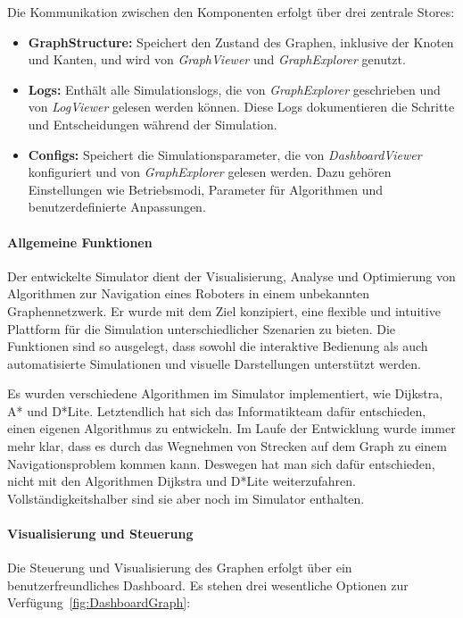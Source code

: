 \documentclass[main.tex]{subfiles} %
\begin{document}
Die Kommunikation zwischen den Komponenten erfolgt über drei zentrale Stores:
\begin{itemize}
  \item \textbf{GraphStructure:} Speichert den Zustand des Graphen,
    inklusive der Knoten und Kanten, und wird von
    \textit{GraphViewer} und \textit{GraphExplorer} genutzt.
  \item \textbf{Logs:} Enthält alle Simulationslogs, die von
    \textit{GraphExplorer} geschrieben und von \textit{LogViewer}
    gelesen werden können. Diese Logs dokumentieren die Schritte und
    Entscheidungen während der Simulation.
  \item \textbf{Configs:} Speichert die Simulationsparameter, die von
    \textit{DashboardViewer} konfiguriert und von
    \textit{GraphExplorer} gelesen werden. Dazu gehören Einstellungen
    wie Betriebsmodi, Parameter für Algorithmen und
    benutzerdefinierte Anpassungen.
\end{itemize}

\paragraph{Allgemeine Funktionen}

Der entwickelte Simulator dient der Visualisierung, Analyse und
Optimierung von Algorithmen zur Navigation eines Roboters in einem
unbekannten Graphennetzwerk. Er wurde mit dem Ziel konzipiert, eine
flexible und intuitive Plattform für die Simulation unterschiedlicher
Szenarien zu bieten. Die Funktionen sind so ausgelegt, dass sowohl
die interaktive Bedienung als auch automatisierte Simulationen und
visuelle Darstellungen unterstützt werden.

Es wurden verschiedene Algorithmen im Simulator implementiert, wie
Dijkstra, A* und D*Lite. Letztendlich hat sich das Informatikteam
dafür entschieden, einen eigenen Algorithmus zu entwickeln. Im Laufe
der Entwicklung wurde immer mehr klar, dass es durch das Wegnehmen
von Strecken auf dem Graph zu einem Navigationsproblem kommen kann.
Deswegen hat man sich dafür entschieden, nicht mit den Algorithmen
Dijkstra und D*Lite weiterzufahren. Vollständigkeitshalber sind sie
aber noch im Simulator enthalten.

\paragraph{Visualisierung und Steuerung}

Die Steuerung und Visualisierung des Graphen erfolgt über ein
benutzerfreundliches Dashboard. Es stehen drei wesentliche Optionen
zur Verfügung~\ref{fig:DashboardGraph}:
\end{document}
